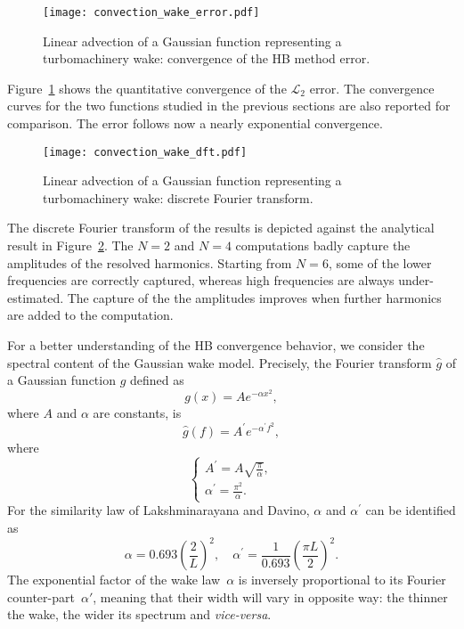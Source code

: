 \begin{figure}[htp]
  \centering
  \texttt{[image: convection\_wake\_error.pdf]}
  \caption{Linear advection of a Gaussian function representing a 
  turbomachinery wake: convergence of the HB method error.}
  \label{fig:conv_wake}
\end{figure}
Figure~\ref{fig:conv_wake} shows the quantitative convergence of 
the $\mathcal{L}_2$ error. The
convergence curves for the two functions studied in the previous sections
are also reported for comparison.
The error follows now a nearly exponential convergence.
\begin{figure}[htp]
  \centering
  \texttt{[image: convection\_wake\_dft.pdf]}
  \caption{Linear advection of a Gaussian function representing a turbomachinery wake: 
  discrete Fourier transform.}
  \label{fig:dft_wake}
\end{figure}
The discrete Fourier transform of the results is
depicted against the analytical result in Figure~\ref{fig:dft_wake}.
The $N=2$ and $N=4$ computations badly capture the amplitudes of the
resolved harmonics.
Starting from $N=6$, some of the lower 
frequencies are correctly captured, whereas high frequencies are
always under-estimated.
The capture of the the amplitudes 
improves when further harmonics are added to the computation.

For a better understanding of the HB convergence behavior, 
we consider the spectral content of the Gaussian wake model. 
Precisely, the Fourier transform $\widehat{g}$ of a Gaussian function $g$
defined as
\begin{equation}
    g(x) = A e^{-\alpha x^2},
    \label{eq:simple_gaussian_function}
\end{equation}
where $A$ and $\alpha$ are constants, is
\begin{equation}
    \widehat{g}(f) = A^\prime e^{-\alpha^\prime f^2},
    \label{eq:fourier_transform_gaussian}
\end{equation}
where
\begin{equation}
  \begin{cases}
    A^\prime=A \sqrt{\frac{\pi}{\alpha}},\\
    \alpha^\prime = \frac{\pi^2}{\alpha}.
  \end{cases}
\end{equation}
For the similarity law of Lakshminarayana and Davino, 
$\alpha$ and $\alpha^\prime$ can be identified as
\begin{equation}
    \alpha =  0.693 \left( \frac{2}{L} \right)^2, \quad
    \alpha^\prime =  \frac{1}{0.693} \left( \frac{\pi L}{2} \right)^2.
    \label{eq:gaussian_params_laksh}
\end{equation}
The exponential factor of the wake law~$\alpha$ is inversely
proportional to its Fourier counter-part~$\alpha'$, meaning that their
width will vary in opposite way: the thinner the wake, the wider its
spectrum and \emph{vice-versa}.

